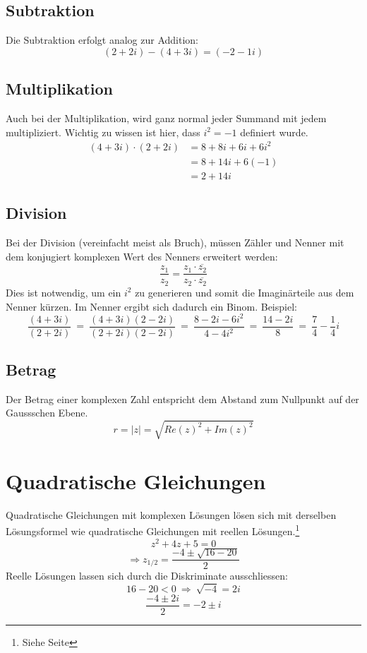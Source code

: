 \documentclass[12pt,a4paper]{scrbook}
\begin{document}
\subsection{Subtraktion}
Die Subtraktion erfolgt analog zur Addition:
\[(2+2i) - (4+3i) = (-2-1i)\]

\subsection{Multiplikation}
Auch bei der Multiplikation, wird ganz normal jeder Summand mit jedem multipliziert.
Wichtig zu wissen ist hier, dass $i^2 = -1$ definiert wurde.
\begin{equation*}
\begin{split}
(4+3i) \cdot (2+2i) & = 8 + 8i + 6i + 6i^2 \\
 & = 8 + 14i + 6(-1)\\
 & = 2 + 14i
\end{split}
\end{equation*}

\subsection{Division}
Bei der Division (vereinfacht meist als Bruch), müssen Zähler und Nenner mit
dem konjugiert komplexen Wert des Nenners erweitert werden:
\[\frac{z_1}{z_2} = \frac{z_1 \cdot \overline{z_2}}{z_2 \cdot \overline{z_2}}\]
Dies ist notwendig, um ein $i^2$ zu generieren und somit die Imaginärteile aus dem
Nenner kürzen. Im Nenner ergibt sich dadurch ein Binom. Beispiel:
\[
\frac{(4+3i)}{(2+2i)} ~ = ~ \frac{(4+3i)(2-2i)}{(2+2i)(2-2i)}
~ = ~ \frac{8-2i-6i^2}{4-4i^2} ~ = ~ \frac{14-2i}{8} ~ = ~ \frac{7}{4} - \frac{1}{4}i
\]

\subsection{Betrag}
\label{komplex_betrag}
Der Betrag einer komplexen Zahl entspricht dem Abstand zum Nullpunkt auf der
Gaussschen Ebene.
\[r = \vert z \vert = \sqrt{Re(z)^2 + Im(z)^2} \]

\section{Quadratische Gleichungen}
Quadratische Gleichungen mit komplexen Lösungen lösen sich mit derselben
Lösungsformel wie quadratische Gleichungen mit reellen Lösungen.\footnote{Siehe Seite \pageref{quadratische_gleichungen}}
\[z^2 + 4z + 5 = 0\]
\[\Rightarrow z_{1/2} = \frac{-4 \pm \sqrt{16-20}}{2} \]
Reelle Lösungen lassen sich durch die Diskriminate ausschliessen:
\[16-20 < 0 ~ \Longrightarrow ~ \sqrt{-4} = 2i\]
\[\frac{-4 \pm 2i}{2} = -2 \pm i\]
\end{document}

